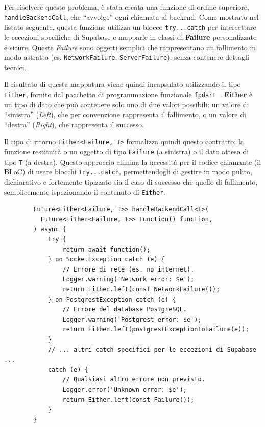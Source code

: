 Per risolvere questo problema, è stata creata una funzione di ordine superiore, \texttt{handleBackendCall}, che ``avvolge'' ogni chiamata al backend.
Come mostrato nel listato seguente, questa funzione utilizza un blocco \texttt{try...catch} per intercettare le eccezioni specifiche di Supabase e mapparle in classi di \textbf{Failure} personalizzate e sicure.
Queste \emph{Failure} sono oggetti semplici che rappresentano un fallimento in modo astratto (es. \texttt{NetworkFailure}, \texttt{ServerFailure}), senza contenere dettagli tecnici.

Il risultato di questa mappatura viene quindi incapsulato utilizzando il tipo \texttt{Either}, fornito dal pacchetto di programmazione funzionale \texttt{fpdart}~\cite{fpdart_package}. \textbf{Either} è un tipo di dato che può contenere solo uno di due valori possibili: un valore di ``sinistra'' (\emph{Left}), che per convenzione rappresenta il fallimento, o un valore di ``destra'' (\emph{Right}), che rappresenta il successo.

Il tipo di ritorno \texttt{Either<Failure, T>} formalizza quindi questo contratto: la funzione restituirà o un oggetto di tipo \texttt{Failure} (a sinistra) o il dato atteso di tipo \texttt{T} (a destra).
Questo approccio elimina la necessità per il codice chiamante (il BLoC) di usare blocchi \texttt{try...catch}, permettendogli di gestire in modo pulito, dichiarativo e fortemente tipizzato sia il caso di successo che quello di fallimento, semplicemente ispezionando il contenuto di \texttt{Either}.

\begin{longlisting}
    \begin{verbatim}
        Future<Either<Failure, T>> handleBackendCall<T>(
          Future<Either<Failure, T>> Function() function,
        ) async {
            try {
                return await function();
            } on SocketException catch (e) {
                // Errore di rete (es. no internet).
                Logger.warning('Network error: $e');
                return Either.left(const NetworkFailure());
            } on PostgrestException catch (e) {
                // Errore del database PostgreSQL.
                Logger.warning('Postgrest error: $e');
                return Either.left(postgrestExceptionToFailure(e));
            }
            // ... altri catch specifici per le eccezioni di Supabase ...
            catch (e) {
                // Qualsiasi altro errore non previsto.
                Logger.error('Unknown error: $e');
                return Either.left(const Failure());
            }
        }
    \end{verbatim}
    \caption{Funzione helper per la gestione sicura delle chiamate al backend.}
    \label{lst:handle-backend-call}
\end{longlisting}

